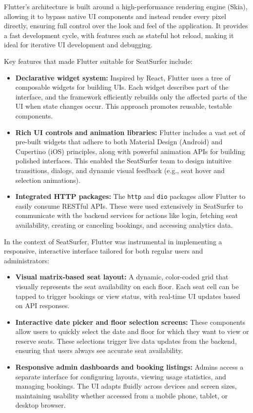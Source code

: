 \documentclass[12pt,a4paper]{report} %
\begin{document}
Flutter's architecture is built around a high-performance rendering engine (Skia), allowing it to bypass native UI components and instead render every pixel directly, ensuring full control over the look and feel of the application. It provides a fast development cycle, with features such as stateful hot reload, making it ideal for iterative UI development and debugging.

Key features that made Flutter suitable for SeatSurfer include:

\begin{itemize}
\item \textbf{Declarative widget system:} Inspired by React, Flutter uses a tree of composable widgets for building UIs. Each widget describes part of the interface, and the framework efficiently rebuilds only the affected parts of the UI when state changes occur. This approach promotes reusable, testable components.
\item \textbf{Rich UI controls and animation libraries:} Flutter includes a vast set of pre-built widgets that adhere to both Material Design (Android) and Cupertino (iOS) principles, along with powerful animation APIs for building polished interfaces. This enabled the SeatSurfer team to design intuitive transitions, dialogs, and dynamic visual feedback (e.g., seat hover and selection animations).
\item \textbf{Integrated HTTP packages:} The \texttt{http} and \texttt{dio} packages allow Flutter to easily consume RESTful APIs. These were used extensively in SeatSurfer to communicate with the backend services for actions like login, fetching seat availability, creating or canceling bookings, and accessing analytics data.
\end{itemize}

In the context of SeatSurfer, Flutter was instrumental in implementing a responsive, interactive interface tailored for both regular users and administrators:

\begin{itemize}
\item \textbf{Visual matrix-based seat layout:} A dynamic, color-coded grid that visually represents the seat availability on each floor. Each seat cell can be tapped to trigger bookings or view status, with real-time UI updates based on API responses.
\item \textbf{Interactive date picker and floor selection screens:} These components allow users to quickly select the date and floor for which they want to view or reserve seats. These selections trigger live data updates from the backend, ensuring that users always see accurate seat availability.
\item \textbf{Responsive admin dashboards and booking listings:} Admins access a separate interface for configuring layouts, viewing usage statistics, and managing bookings. The UI adapts fluidly across devices and screen sizes, maintaining usability whether accessed from a mobile phone, tablet, or desktop browser.
\end{itemize}
\end{document}
